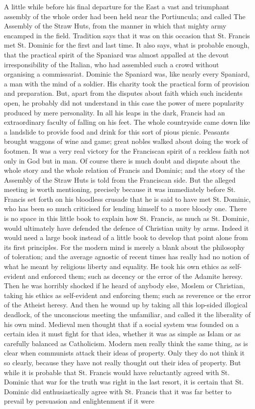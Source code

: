 \documentclass{book}
\begin{document}
A little while before his final departure for the East a vast and triumphant assembly of the whole order had been held near the Portiuncula; and called The Assembly of the Straw Huts, from the manner in which that mighty army encamped in the field. Tradition says that it was on this occasion that St. Francis met St. Dominic for the first and last time. It also says, what is probable enough, that the practical spirit of the Spaniard was almost appalled at the devout irresponsibility of the Italian, who had assembled such a crowd without organising a commissariat. Dominic the Spaniard was, like nearly every Spaniard, a man with the mind of a soldier. His charity took the practical form of provision and preparation. But, apart from the disputes about faith which such incidents open, he probably did not understand in this case the power of mere popularity produced by mere personality. In all his leaps in the dark, Francis had an extraordinary faculty of falling on his feet. The whole countryside came down like a landslide to provide food and drink for this sort of pious picnic. Peasants brought waggons of wine and game; great nobles walked about doing the work of footmen. It was a very real victory for the Franciscan spirit of a reckless faith not only in God but in man. Of course there is much doubt and dispute about the whole story and the whole relation of Francis and Dominic; and the story of the Assembly of the Straw Huts is told from the Franciscan side. But the alleged meeting is worth mentioning, precisely because it was immediately before St. Francis set forth on his bloodless crusade that he is said to have met St. Dominic, who has been so much criticised for lending himself to a more bloody one. There is no space in this little book to explain how St. Francis, as much as St. Dominic, would ultimately have defended the defence of Christian unity by arms. Indeed it would need a large book instead of a little book to develop that point alone from its first principles. For the modern mind is merely a blank about the philosophy of toleration; and the average agnostic of recent times has really had no notion of what he meant by religious liberty and equality. He took his own ethics as self-evident and enforced them; such as decency or the error of the Adamite heresy. Then he was horribly shocked if he heard of anybody else, Moslem or Christian, taking his ethics as self-evident and enforcing them; such as reverence or the error of the Atheist heresy. And then he wound up by taking all this lop-sided illogical deadlock, of the unconscious meeting the unfamiliar, and called it the liberality of his own mind. Medieval men thought that if a social system was founded on a certain idea it must fight for that idea, whether it was as simple as Islam or as carefully balanced as Catholicism. Modern men really think the same thing, as is clear when communists attack their ideas of property. Only they do not think it so clearly, because they have not really thought out their idea of property. But while it is probable that St. Francis would have reluctantly agreed with St. Dominic that war for the truth was right in the last resort, it is certain that St. Dominic did enthusiastically agree with St. Francis that it was far better to prevail by persuasion and enlightenment if it were 
\end{document}

